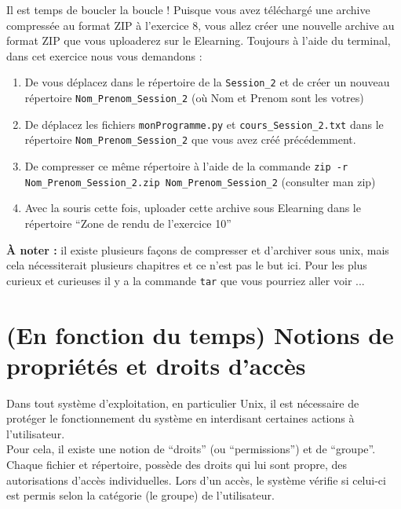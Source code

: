 \documentclass{article}
\begin{document}
\begin{exercice}

Il est temps de boucler la boucle ! Puisque vous avez téléchargé une archive compressée au format ZIP à l'exercice 8, vous allez créer une nouvelle archive au format ZIP que vous uploaderez sur le Elearning. 
Toujours à l'aide du terminal, dans cet exercice nous vous demandons : 

\begin{enumerate}
\item 
De vous déplacez dans le répertoire de la \texttt{Session\_2} et de créer un nouveau répertoire \texttt{Nom\_Prenom\_Session\_2} (où Nom et Prenom sont les votres)
\item 
De déplacez les fichiers \texttt{monProgramme.py} et \texttt{cours\_{Session\_2}.txt} dans le répertoire \texttt{Nom\_Prenom\_Session\_2} que vous avez créé précédemment.
\item 
De compresser ce même répertoire à l'aide de la commande \texttt{zip -r Nom\_Prenom\_Session\_2.zip Nom\_Prenom\_Session\_2} (consulter man zip)
\item
Avec la souris cette fois, uploader cette archive sous Elearning dans le répertoire ``Zone de rendu de l'exercice 10''
\end{enumerate}

\textbf{À noter : } il existe plusieurs fa\c cons de compresser et d'archiver sous unix, mais cela nécessiterait plusieurs chapitres et ce n'est pas le but ici. Pour les plus curieux et curieuses il y a la commande \texttt{tar} que vous pourriez aller voir ...

\end{exercice}


\hypertarget{(En fonction du temps) Notions de propriétés et droits d'accès}{%
\section{(En fonction du temps) Notions de propriétés et droits d'accès}\label{(En fonction du temps) Notions de propriétés et droits d'accès}}

Dans tout système d'exploitation, en particulier Unix, il est nécessaire de protéger le
fonctionnement du système en interdisant certaines actions à l'utilisateur.\\
Pour cela, il existe une notion de ``droits'' (ou ``permissions'') et de ``groupe''. \\
Chaque fichier et répertoire, possède des droits qui lui sont propre, des autorisations d'accès individuelles. 
Lors d'un accès, le système vérifie si celui-ci est permis selon la catégorie (le groupe) de l'utilisateur.
\end{document}
